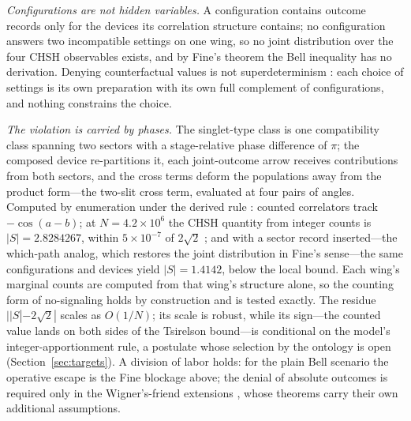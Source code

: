 \documentclass[11pt]{article}
\theoremstyle{definition}
\theoremstyle{remark}
\begin{document}
\emph{Configurations are not hidden variables.} A configuration contains outcome records only for the devices its correlation structure contains; no configuration answers two incompatible settings on one wing, so no joint distribution over the four CHSH observables exists, and by Fine's theorem \cite{Fine1982} the Bell inequality has no derivation. Denying counterfactual values is not superdeterminism \cite{tHooft2016}: each choice of settings is its own preparation with its own full complement of configurations, and nothing constrains the choice.

\emph{The violation is carried by phases.} The singlet-type class is one compatibility class spanning two sectors with a stage-relative phase difference of $\pi$; the composed device re-partitions it, each joint-outcome arrow receives contributions from both sectors, and the cross terms deform the populations away from the product form---the two-slit cross term, evaluated at four pairs of angles. Computed by enumeration under the derived rule \cite{TillittCHSH}: counted correlators track $-\cos(a-b)$; at $N = 4.2 \times 10^6$ the CHSH quantity from integer counts is $|S| = 2.8284267$, within $5 \times 10^{-7}$ of $2\sqrt{2}$ \cite{Tsirelson1980}; and with a sector record inserted---the which-path analog, which restores the joint distribution in Fine's sense---the same configurations and devices yield $|S| = 1.4142$, below the local bound. Each wing's marginal counts are computed from that wing's structure alone, so the counting form of no-signaling holds by construction and is tested exactly. The residue $||S| - 2\sqrt{2}|$ scales as $O(1/N)$; its scale is robust, while its sign---the counted value lands on both sides of the Tsirelson bound---is conditional on the model's integer-apportionment rule, a postulate whose selection by the ontology is open (Section~\ref{sec:targets}). A division of labor holds: for the plain Bell scenario the operative escape is the Fine blockage above; the denial of absolute outcomes is required only in the Wigner's-friend extensions \cite{Brukner2018,Bong2020}, whose theorems carry their own additional assumptions.
\end{document}
